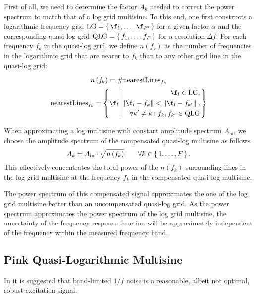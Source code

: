   First of all, we need to determine the factor $A_k$ needed to correct the power spectrum to match that of a log grid multisine.
  To this end, one first constructs a logarithmic frequency grid $\LOGGRID = \set{\f_1, \ldots, \f_{F'}}$ for a given factor $\alpha$ and the corresponding quasi-log grid $\mathrm{QLG} = \set{f_1, \ldots, f_F}$ for a resolution $\Delta f$.
  For each frequency $f_k$ in the quasi-log grid, we define $n\left(f_k\right)$ as the number of frequencies in the logarithmic grid that are nearer to $f_k$ than to any other grid line in the quasi-log grid:
  
  \begin{equation}
    n\left(f_k\right) = \# \mathrm{nearestLines}_{f_k}
    \label{eq:excitation:nfk}
  \end{equation}
  \begin{equation}
    \mathrm{nearestLines}_{f_k} =
      \left\{ 
        \f_l \given{\begin{aligned} 
                       \f_l \in \LOGGRID, \\
                       \norm{\f_l - f_k} < \norm{\f_l - f_{k'}},\\
                       \forall k' \neq k: f_k, f_{k'} \in \QLOGGRID
                    \end{aligned}}
      \right\}
    \label{eq:excitation:nearestLines}
  \end{equation}  
  
  When approximating a log multisine with constant amplitude spectrum $A_{\mathrm{in}}$, we choose the amplitude spectrum of the compensated quasi-log multisine as follows
  \begin{equation}
    A_k = A_{\mathrm{in}} \cdot \sqrt{n\left(f_k\right)}\qquad \forall k \in \set{1,\ldots,F}
  \text{.}
  \label{eq:excitation:compensationAk}
  \end{equation}
  This effectively concentrates the total power of the $n\left( f_k \right)$ surrounding lines in the log grid multisine at the frequency $f_k$ in the compensated quasi-log multisine.
  
  The power spectrum of this compensated signal approximates the one of the log grid multisine better than an uncompensated quasi-log grid.
  As the power spectrum approximates the power spectrum of the log grid multisine, the uncertainty of the frequency response function will be approximately independent of the frequency within the measured frequency band.

  \subsection{Pink Quasi-Logarithmic Multisine}
  In \citep{Rojas2007} it is suggested that band-limited $1/f$ noise is a reasonable, albeit not optimal, robust excitation signal.

